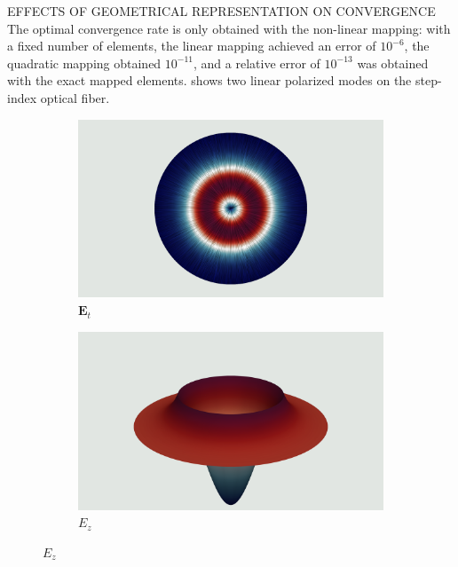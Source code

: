 \documentclass[debug]{beamer} %
\begin{document}
\begin{frame}
\begin{minipage}[t]{0.45\textwidth}
\begin{block}{\boxnumber EFFECTS OF GEOMETRICAL REPRESENTATION ON CONVERGENCE}
	        The optimal convergence rate is only obtained with the non-linear mapping: with a fixed number of elements, the linear mapping achieved an error of $10^{-6}$, the quadratic mapping obtained $10^{-11}$, and a relative error of $10^{-13}$ was obtained with the exact mapped elements.  shows two linear polarized modes on the step-index optical fiber.
	        \begin{figure}[hb]
	        	\begin{mdframed}[backgroundcolor=bggrey]
					\centering
					\begin{subfigure}[b]{.4999\textwidth}
						\centering
						\caption*{$\displaystyle\bm{E}_t$}
						\includegraphics[width=1\linewidth]{images/et2posterStepFiber.png}%
					\end{subfigure}\hfill
					\begin{subfigure}[b]{.4999\textwidth}
						\centering
						\caption*{$\displaystyle E_z$}
						\includegraphics[width=1\linewidth]{images/ez2posterStepFiber.png}%
					\end{subfigure}


\end{mdframed}
\end{figure}
\end{block}
\end{minipage}
\end{frame}
\end{document}
